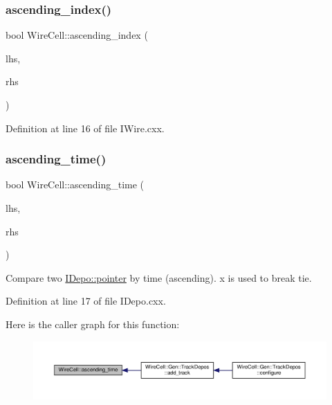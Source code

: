 \subsubsection{\texorpdfstring{ascending\+\_\+index()}{ascending\_index()}}
{\footnotesize\ttfamily bool Wire\+Cell\+::ascending\+\_\+index (\begin{DoxyParamCaption}\item[{\hyperlink{class_wire_cell_1_1_i_data_aff870b3ae8333cf9265941eef62498bc}{I\+Wire\+::pointer}}]{lhs,  }\item[{\hyperlink{class_wire_cell_1_1_i_data_aff870b3ae8333cf9265941eef62498bc}{I\+Wire\+::pointer}}]{rhs }\end{DoxyParamCaption})}



Definition at line 16 of file I\+Wire.\+cxx.

\mbox{\label{namespace_wire_cell_a294987a743cfdf49097f1215ac70ab66}} 
\subsubsection{\texorpdfstring{ascending\+\_\+time()}{ascending\_time()}}
{\footnotesize\ttfamily bool Wire\+Cell\+::ascending\+\_\+time (\begin{DoxyParamCaption}\item[{const \hyperlink{class_wire_cell_1_1_i_data_aff870b3ae8333cf9265941eef62498bc}{Wire\+Cell\+::\+I\+Depo\+::pointer} \&}]{lhs,  }\item[{const \hyperlink{class_wire_cell_1_1_i_data_aff870b3ae8333cf9265941eef62498bc}{Wire\+Cell\+::\+I\+Depo\+::pointer} \&}]{rhs }\end{DoxyParamCaption})}



Compare two \hyperlink{class_wire_cell_1_1_i_data_aff870b3ae8333cf9265941eef62498bc}{I\+Depo\+::pointer} by time (ascending). x is used to break tie. 



Definition at line 17 of file I\+Depo.\+cxx.

Here is the caller graph for this function\+:
\nopagebreak
\begin{figure}[H]
\begin{center}
\leavevmode
\includegraphics[width=350pt]{namespace_wire_cell_a294987a743cfdf49097f1215ac70ab66_icgraph}
\end{center}
\end{figure}
\mbox{\label{namespace_wire_cell_a2e8924bbcd70754adeb72b8e14f1d987}} 
